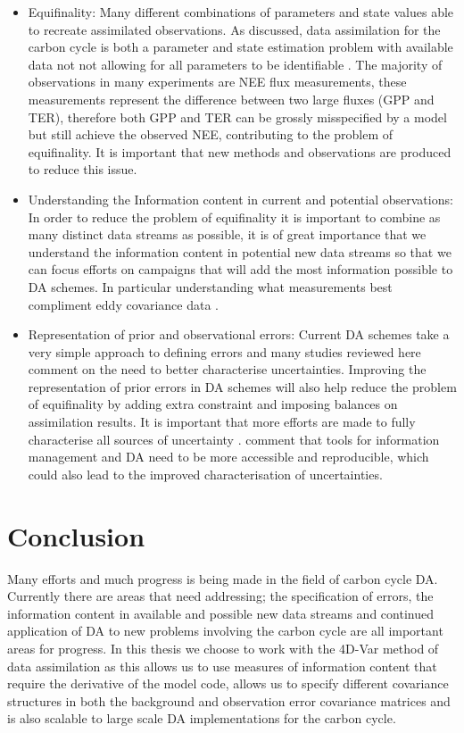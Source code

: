 \documentclass[12pt]{article}
\begin{document}
\begin{itemize}

\item Equifinality: Many different combinations of parameters and state values able to recreate assimilated observations. As discussed, data assimilation for the carbon cycle is both a parameter and state estimation problem with available data not not allowing for all parameters to be identifiable \citep{Luo2009}. The majority of observations in many experiments are NEE flux measurements, these measurements represent the difference between two large fluxes (GPP and TER), therefore both GPP and TER can be grossly misspecified by a model but still achieve the observed NEE, contributing to the problem of equifinality. It is important that new methods and observations are produced to reduce this issue.

\item Understanding the Information content in current and potential observations: In order to reduce the problem of equifinality it is important to combine as many distinct data streams as possible, it is of great importance that we understand the information content in potential new data streams so that we can focus efforts on campaigns that will add the most information possible to DA schemes. In particular understanding what measurements best compliment eddy covariance data \citet{rayner2010current}.

\item Representation of prior and observational errors: Current DA schemes take a very simple approach to defining errors and many studies reviewed here comment on the need to better characterise uncertainties. Improving the representation of prior errors in DA schemes will also help reduce the problem of equifinality by adding extra constraint and imposing balances on assimilation results. It is important that more efforts are made to fully characterise all sources of uncertainty \citep{Keenan2011, raupach2005model}. \citet{Dietze2013} comment that tools for information management and DA need to be more accessible and reproducible, which could also lead to the improved characterisation of uncertainties.
\end{itemize}

\section{Conclusion} 

Many efforts and much progress is being made in the field of carbon cycle DA. Currently there are areas that need addressing; the specification of errors, the information content in available and possible new data streams and continued application of DA to new problems involving the carbon cycle are all important areas for progress. In this thesis we choose to work with the 4D-Var method of data assimilation as this allows us to use measures of information content that require the derivative of the model code, allows us to specify different covariance structures in both the background and observation error covariance matrices and is also scalable to large scale DA implementations for the carbon cycle. 
\end{document}
